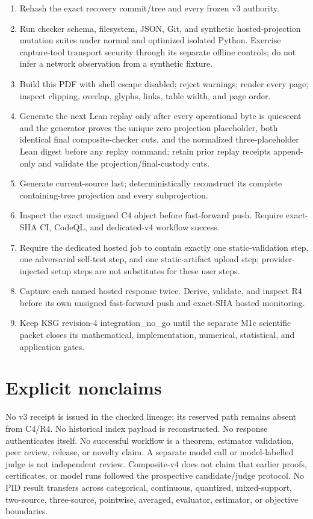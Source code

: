 \documentclass[11pt,a4paper]{article}
\newcommand{\Status}[1]{\textsf{#1}}
\begin{document}
\begin{enumerate}
  \item Rehash the exact recovery commit/tree and every frozen v3 authority.
  \item Run checker schema, filesystem, JSON, Git, and synthetic hosted-projection mutation suites
        under normal and optimized isolated Python. Exercise capture-tool transport security through
        its separate offline controls; do not infer a network observation from a synthetic fixture.
  \item Build this PDF with shell escape disabled; reject warnings; render every page; inspect
        clipping, overlap, glyphs, links, table width, and page order.
  \item Generate the next Lean replay only after every operational byte is quiescent and the
        generator proves the unique zero projection placeholder, both identical final
        composite-checker cuts, and the normalized three-placeholder Lean digest before any replay
        command; retain prior replay receipts append-only and validate the projection/final-custody
        cuts.
  \item Generate current-source last; deterministically reconstruct its complete containing-tree
        projection and every subprojection.
  \item Inspect the exact unsigned C4 object before fast-forward push. Require exact-SHA CI,
        CodeQL, and dedicated-v4 workflow success.
  \item Require the dedicated hosted job to contain exactly one static-validation step, one
        adversarial self-test step, and one static-artifact upload step; provider-injected setup
        steps are not substitutes for these user steps.
  \item Capture each named hosted response twice. Derive, validate, and inspect R4 before its own
        unsigned fast-forward push and exact-SHA hosted monitoring.
  \item Keep KSG revision-4 \Status{integration\_no\_go} until the separate M1c scientific packet
        closes its mathematical, implementation, numerical, statistical, and application gates.
\end{enumerate}

\section{Explicit nonclaims}

No v3 receipt is issued in the checked lineage; its reserved path remains absent from C4/R4. No historical index payload is reconstructed. No response authenticates
itself. No successful workflow is a theorem, estimator validation, peer review, release, or novelty
claim. A separate model call or model-labelled judge is not independent review. Composite-v4 does
not claim that earlier proofs, certificates, or model runs followed the prospective candidate/judge
protocol. No PID result transfers across categorical, continuous, quantized, mixed-support,
two-source, three-source, pointwise, averaged, evaluator, estimator, or objective boundaries.
\end{document}
